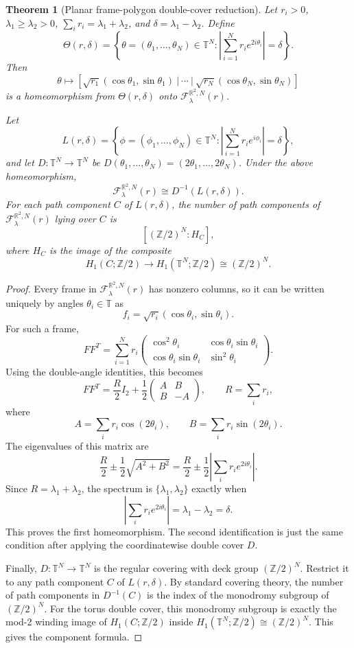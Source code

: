 \documentclass[11pt]{article}
\newtheorem{theorem}{Theorem}
\newcommand{\R}{\mathbb R}
\newcommand{\T}{\mathbb T}
\newcommand{\Z}{\mathbb Z}
\newcommand{\F}{\mathcal F}
\begin{document}
\begin{theorem}[Planar frame-polygon double-cover reduction]
Let \(r_i>0\), \(\lambda_1\geq\lambda_2>0\), \(\sum_i r_i=\lambda_1+\lambda_2\), and \(\delta=\lambda_1-\lambda_2\). Define
\[
\Theta(r,\delta)
=
\left\{\theta=(\theta_1,\dots,\theta_N)\in\T^N:
\left|\sum_{i=1}^N r_i e^{2i\theta_i}\right|=\delta
\right\}.
\]
Then
\[
\theta\longmapsto
\left[\sqrt{r_1}(\cos\theta_1,\sin\theta_1)\ |\ \cdots\ |\ \sqrt{r_N}(\cos\theta_N,\sin\theta_N)\right]
\]
is a homeomorphism from \(\Theta(r,\delta)\) onto \(\F^{\R^2,N}_{\lambda}(r)\).

Let
\[
L(r,\delta)
=
\left\{\phi=(\phi_1,\dots,\phi_N)\in\T^N:
\left|\sum_{i=1}^N r_i e^{i\phi_i}\right|=\delta
\right\},
\]
and let \(D:\T^N\to\T^N\) be \(D(\theta_1,\dots,\theta_N)=(2\theta_1,\dots,2\theta_N)\). Under the above homeomorphism,
\[
\F^{\R^2,N}_{\lambda}(r)\cong D^{-1}(L(r,\delta)).
\]
For each path component \(C\) of \(L(r,\delta)\), the number of path components of \(\F^{\R^2,N}_{\lambda}(r)\) lying over \(C\) is
\[
\left[(\Z/2)^N:H_C\right],
\]
where \(H_C\) is the image of the composite
\[
H_1(C;\Z/2)\longrightarrow H_1(\T^N;\Z/2)\cong(\Z/2)^N.
\]
\end{theorem}

\begin{proof}
Every frame in \(\F^{\R^2,N}_{\lambda}(r)\) has nonzero columns, so it can be written uniquely by angles \(\theta_i\in\T\) as
\[
f_i=\sqrt{r_i}(\cos\theta_i,\sin\theta_i).
\]
For such a frame,
\[
FF^T
=
\sum_{i=1}^N r_i
\begin{pmatrix}
\cos^2\theta_i&\cos\theta_i\sin\theta_i\\
\cos\theta_i\sin\theta_i&\sin^2\theta_i
\end{pmatrix}.
\]
Using the double-angle identities, this becomes
\[
FF^T
=
\frac{R}{2}I_2+
\frac12
\begin{pmatrix}
A&B\\
B&-A
\end{pmatrix},
\qquad
R=\sum_i r_i,
\]
where
\[
A=\sum_i r_i\cos(2\theta_i),
\qquad
B=\sum_i r_i\sin(2\theta_i).
\]
The eigenvalues of this matrix are
\[
\frac{R}{2}\pm\frac12\sqrt{A^2+B^2}
=
\frac{R}{2}\pm\frac12\left|\sum_i r_i e^{2i\theta_i}\right|.
\]
Since \(R=\lambda_1+\lambda_2\), the spectrum is \(\{\lambda_1,\lambda_2\}\) exactly when
\[
\left|\sum_i r_i e^{2i\theta_i}\right|=\lambda_1-\lambda_2=\delta.
\]
This proves the first homeomorphism. The second identification is just the same condition after applying the coordinatewise double cover \(D\).

Finally, \(D:\T^N\to\T^N\) is the regular covering with deck group \((\Z/2)^N\). Restrict it to any path component \(C\) of \(L(r,\delta)\). By standard covering theory, the number of path components in \(D^{-1}(C)\) is the index of the monodromy subgroup of \((\Z/2)^N\). For the torus double cover, this monodromy subgroup is exactly the mod-2 winding image of \(H_1(C;\Z/2)\) inside \(H_1(\T^N;\Z/2)\cong(\Z/2)^N\). This gives the component formula.
\end{proof}
\end{document}
